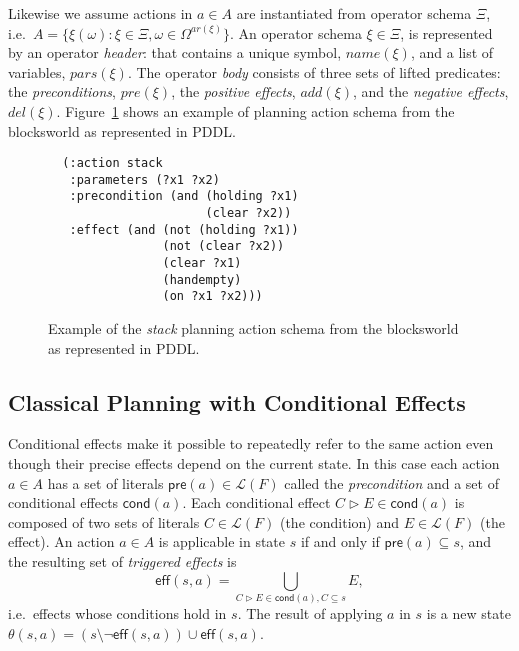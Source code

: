 \documentclass[letterpaper]{article} %
\newcommand{\pre}{\mathsf{pre}}     %
\newcommand{\eff}{\mathsf{eff}}     %
\newcommand{\cond}{\mathsf{cond}}   %
\begin{document}
Likewise we assume actions in $a\in A$ are instantiated from operator schema $\Xi$, i.e.~$A=\{\xi(\omega):\xi\in\Xi,\omega\in\Omega^{ar(\xi)}\}$. An operator schema $\xi\in \Xi$, is represented by an operator {\em header}: that contains a unique symbol, $name(\xi)$, and a list of variables, $pars(\xi)$. The operator {\em body} consists of three sets of lifted predicates: the {\em preconditions}, $pre(\xi)$, the {\em positive effects}, $add(\xi)$, and the {\em negative effects}, $del(\xi)$. Figure~\ref{fig:stack} shows an example of planning action schema from the blocksworld as represented in PDDL.

\begin{figure}[hbt]
\begin{footnotesize}
\begin{verbatim}
  (:action stack
   :parameters (?x1 ?x2)
   :precondition (and (holding ?x1) 
                      (clear ?x2))
   :effect (and (not (holding ?x1))
                (not (clear ?x2))
                (clear ?x1)
                (handempty)
                (on ?x1 ?x2)))
\end{verbatim}
\end{footnotesize}
 \caption{\small Example of the {\em stack} planning action schema from the blocksworld as represented in PDDL.}
\label{fig:stack}
\end{figure}


\subsection{Classical Planning with Conditional Effects}
Conditional effects make it possible to repeatedly refer to the same action even though their precise effects depend on the current state. In this case each action $a\in A$ has a set of literals $\pre(a)\in\mathcal{L}(F)$ called the {\em precondition} and a set of conditional effects $\cond(a)$. Each conditional effect $C\rhd E\in\cond(a)$ is composed of two sets of literals $C\in\mathcal{L}(F)$ (the condition) and $E\in\mathcal{L}(F)$ (the effect). An action $a\in A$ is applicable in state $s$ if and only if $\pre(a)\subseteq s$, and the resulting set of {\em triggered effects} is
\[
\eff(s,a)=\bigcup_{C\rhd E\in\cond(a),C\subseteq s} E,
\]
i.e.~effects whose conditions hold in $s$. The result of applying $a$ in $s$ is a new state $\theta(s,a)=(s\setminus \neg\eff(s,a))\cup\eff(s,a)$.
\end{document}
